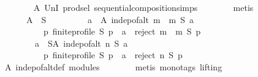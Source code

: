 \begin{isabellebody}
\ \ \ \ \ \ \isamarkupfalse%
\ A\ UnI{}\ prod{\isachardot}{\kern0pt}sel\ sequential{\isacharunderscore}{\kern0pt}composition{\isachardot}{\kern0pt}simps\isanewline
\ \ \ \ \ \ \isamarkupfalse%
\ metis\isanewline
\ \ \ \ \isamarkupfalse%
\ \isamarkupfalse%
\isanewline
\ \ \ \ \ \ {\isachardoublequoteopen}A\ {\isasymsubseteq}\ S\ {\isasymand}\isanewline
\ \ \ \ \ \ \ \ {\isacharparenleft}{\kern0pt}{\isasymforall}a\ {\isasymin}\ A{\isachardot}{\kern0pt}\ indep{\isacharunderscore}{\kern0pt}of{\isacharunderscore}{\kern0pt}alt\ {\isacharparenleft}{\kern0pt}m\ {\isasymtriangleright}\ m{}{\isacharparenright}{\kern0pt}\ S\ a\ {\isasymand}\isanewline
\ \ \ \ \ \ \ \ \ \ {\isacharparenleft}{\kern0pt}{\isasymforall}p{\isachardot}{\kern0pt}\ finite{\isacharunderscore}{\kern0pt}profile\ S\ p\ {\isasymlongrightarrow}\ a\ {\isasymin}\ reject\ {\isacharparenleft}{\kern0pt}m\ {\isasymtriangleright}\ m{}{\isacharparenright}{\kern0pt}\ S\ p{\isacharparenright}{\kern0pt}{\isacharparenright}{\kern0pt}\ {\isasymand}\isanewline
\ \ \ \ \ \ \ \ {\isacharparenleft}{\kern0pt}{\isasymforall}a\ {\isasymin}\ S{\isacharminus}{\kern0pt}A{\isachardot}{\kern0pt}\ indep{\isacharunderscore}{\kern0pt}of{\isacharunderscore}{\kern0pt}alt\ n\ S\ a\ {\isasymand}\isanewline
\ \ \ \ \ \ \ \ \ \ {\isacharparenleft}{\kern0pt}{\isasymforall}p{\isachardot}{\kern0pt}\ finite{\isacharunderscore}{\kern0pt}profile\ S\ p\ {\isasymlongrightarrow}\ a\ {\isasymin}\ reject\ n\ S\ p{\isacharparenright}{\kern0pt}{\isacharparenright}{\kern0pt}{\isachardoublequoteclose}\isanewline
\ \ \ \ \ \ \isamarkupfalse%
\ A\ indep{\isacharunderscore}{\kern0pt}of{\isacharunderscore}{\kern0pt}alt{\isacharunderscore}{\kern0pt}def\ modules\isanewline
\ \ \ \ \ \ \isamarkupfalse%
\ {\isacharparenleft}{\kern0pt}metis\ {\isacharparenleft}{\kern0pt}mono{\isacharunderscore}{\kern0pt}tags{\isacharcomma}{\kern0pt}\ lifting{\isacharparenright}{\kern0pt}{\isacharparenright}{\kern0pt}\isanewline
\ \ \isamarkupfalse%
\isanewline
{}\isamarkupfalse%
%
\endisatagproof
{\isafoldproof}%
%
\isadelimproof
\isanewline
%
\endisadelimproof
%
\isadelimtheory
\isanewline
%
\endisadelimtheory
%
\isatagtheory
{}\isamarkupfalse%
%
\endisatagtheory
{\isafoldtheory}%
%
\isadelimtheory
%
\endisadelimtheory
%
\end{isabellebody}%
\endinput
